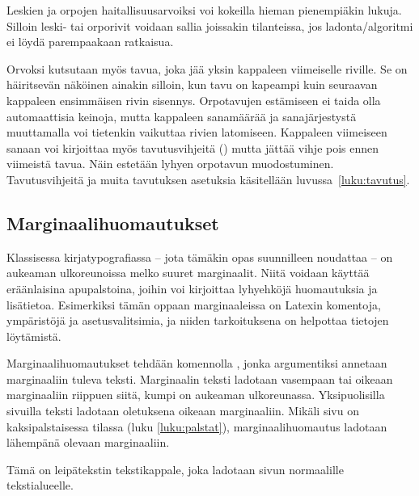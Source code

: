 \begin{koodilohkosis}
\end{koodilohkosis}

Leskien ja orpojen haitallisuusarvoiksi voi kokeilla hieman pienempiäkin
lukuja. Silloin leski- tai orporivit voidaan sallia joissakin
tilanteissa, jos ladonta\-/algoritmi ei löydä parempaakaan ratkaisua.

Orvoksi kutsutaan myös tavua, joka jää yksin kappaleen viimeiselle
riville. Se on häiritsevän näköinen ainakin silloin, kun tavu on
kapeampi kuin seuraavan kappaleen ensimmäisen rivin sisennys.
Orpotavujen estämiseen ei taida olla automaattisia keinoja, mutta
kappaleen sanamäärää ja sanajärjestystä muuttamalla voi tietenkin
vaikuttaa rivien latomiseen. Kappaleen viimeiseen sanaan voi kirjoittaa
myös tavutusvihjeitä (\komento{-}) mutta jättää vihje pois ennen
viimeistä tavua. Näin estetään lyhyen orpotavun muodostuminen.
Tavutusvihjeitä ja muita tavutuksen asetuksia käsitellään
luvussa~\ref{luku:tavutus}.

\subsection{Marginaalihuomautukset}
\label{luku:marginaalihuomautukset}

Klassisessa kirjatypografiassa -- jota tämäkin opas suunnilleen
noudattaa -- on aukeaman ulkoreunoissa melko suuret marginaalit. Niitä
voidaan käyttää eräänlaisina apupalstoina, joihin voi kirjoittaa
lyhyehköjä huomautuksia ja lisätietoa. Esimerkiksi tämän oppaan
marginaaleissa on Latexin komentoja, ympäristöjä ja asetusvalitsimia, ja
niiden tarkoituksena on helpottaa tietojen löytämistä.

Marginaalihuomautukset tehdään komennolla , jonka
argumentiksi annetaan marginaaliin tuleva teksti. Marginaalin teksti
ladotaan vasempaan tai oikeaan marginaaliin riippuen siitä, kumpi on
aukeaman ulkoreunassa. Yksipuolisilla sivuilla teksti ladotaan
oletuksena oikeaan marginaaliin. Mikäli sivu on kaksipalstaisessa
tilassa (luku \ref{luku:palstat}), marginaalihuomautus ladotaan
lähempänä olevaan marginaaliin.

\begin{koodilohkosis}
Tämä on leipätekstin tekstikappale,
joka ladotaan sivun normaalille tekstialueelle.
\end{koodilohkosis}

